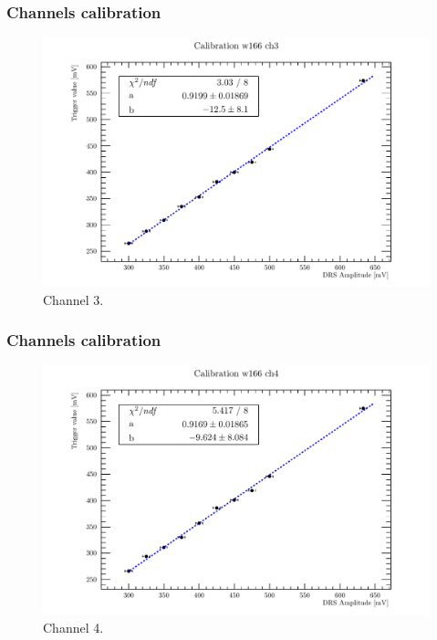 \documentclass[9pt]{beamer}
\begin{document}

\begin{frame} [fragile]
\small
	\frametitle{Channels calibration}
    		\begin{figure}
		 \centering
			\includegraphics[scale=0.5]{figures/ch3.pdf}
			\caption{Channel 3.}
		\end{figure}  
\end{frame}


\begin{frame} [fragile]
\small
	\frametitle{Channels calibration}
    		\begin{figure}
		 \centering
			\includegraphics[scale=0.5]{figures/ch4.pdf}
			\caption{Channel 4.}
		\end{figure}  
\end{frame}
\end{document}
